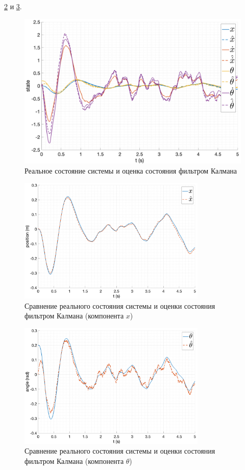 \ref{fig:lqg_filter_cmp_x1} и \ref{fig:lqg_filter_cmp_ang2}.
\begin{figure}[ht!]
    \centering
    \includegraphics[width=\textwidth]{media/plots/LQG/observer_cmp_1.png}
    \caption{Реальное состояние системы и оценка состояния фильтром Калмана}
    \label{fig:lqg_filter_cmp}
\end{figure}
\begin{figure}[ht!]
    \centering
    \includegraphics[width=0.8\textwidth]{media/plots/LQG/observer_x_cmp_1.png}
    \caption{Сравнение реального состояния системы и оценки состояния фильтром Калмана (компонента $x$)}
    \label{fig:lqg_filter_cmp_x1} 
\end{figure}
\begin{figure}[ht!]
    \centering
    \includegraphics[width=0.8\textwidth]{media/plots/LQG/observer_theta_cmp_1.png}
    \caption{Сравнение реального состояния системы и оценки состояния фильтром Калмана (компонента $\theta$)}
    \label{fig:lqg_filter_cmp_ang2}
\end{figure}

